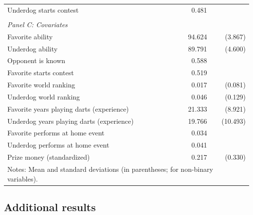\documentclass[11pt,a4paper]{article}
\begin{document}
\begin{table}[H]
\begin{tabular}{l r r r}
   		    Underdog starts contest                          & &  0.481      &           \\
            \vspace{-0.5em}  \\
            \multicolumn{4}{l}{\textit{Panel C: Covariates}} \vspace{0.7em} \\ 
			Favorite ability                             & &  94.624     & (3.867)   \\
			Underdog ability                             & &  89.791     & (4.600)   \\
            Opponent is known                            & & 0.588       &           \\
   			Favorite starts contest                        & &  0.519      &           \\
      		Favorite world ranking                       & &  0.017      & (0.081) \\
         	Underdog world ranking                       & &  0.046      & (0.129) \\
            Favorite years playing darts (experience)    & &  21.333     & (8.921)   \\
            Underdog years playing darts (experience)    & &  19.766     & (10.493)  \\
            Favorite performs at home event              & &   0.034     &           \\
            Underdog performs at home event              & &   0.041     &           \\
            Prize money (standardized)                   & &   0.217     & (0.330)   \\
			\bottomrule \bottomrule
			\multicolumn{4}{l}{\footnotesize Notes: Mean and standard deviations (in parentheses; for non-binary variables).}
		\end{tabular}
	\end{table}

\subsection{Additional results}\label{subsec:app_addres}
\end{document}
